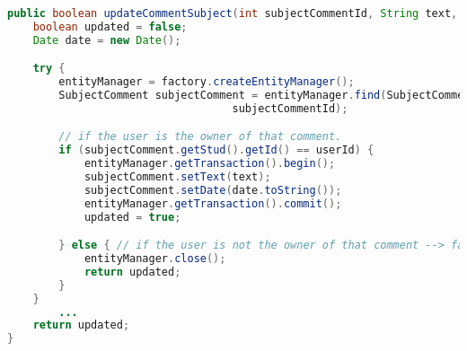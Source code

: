 \begin{lstlisting}[language=Java,  basicstyle=\footnotesize]
public boolean updateCommentSubject(int subjectCommentId, String text, int userId) 
	boolean updated = false;
	Date date = new Date();

	try {
		entityManager = factory.createEntityManager();
		SubjectComment subjectComment = entityManager.find(SubjectComment.class,
								   subjectCommentId);

		// if the user is the owner of that comment.
		if (subjectComment.getStud().getId() == userId) {
			entityManager.getTransaction().begin();
			subjectComment.setText(text);
			subjectComment.setDate(date.toString());
			entityManager.getTransaction().commit();
			updated = true;

		} else { // if the user is not the owner of that comment --> false.
			entityManager.close();
			return updated;
		}
	} 
        ...
	return updated;
}
\end{lstlisting}
